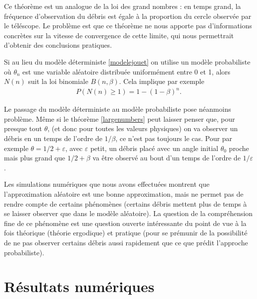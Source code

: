 \documentclass[a4paper,11pt]{article}
\newcommand{\eps}{\varepsilon}
\numberwithin{section}{part}
\begin{document}
Ce théorème est un analogue de la loi des grand nombres : en temps
grand, la fréquence d'observation du débris est égale à la proportion
du cercle observée par le téléscope. Le problème est que ce théorème
ne nous apporte pas d'informations concrètes sur la vitesse de
convergence de cette limite, qui nous permettrait d'obtenir des
conclusions pratiques. 

Si au lieu du modèle déterministe \eqref{modelejouet} on utilise un
modèle probabiliste où $\theta_{n}$ est une variable aléatoire
distribuée uniformément entre 0 et 1, alors $N(n)$ suit la loi
binomiale $B(n,\beta)$. Cela implique par exemple
\begin{align}
  P(N(n) \geq 1) = 1 - (1-\beta)^{n}.
\end{align}

Le passage du modèle déterministe au modèle probabiliste pose
néanmoins problème. Même si le théorème \eqref{largenumbers} peut
laisser penser que, pour presque tout $\theta$, (et donc pour toutes
les valeurs physiques) on va observer un débris en un temps de l'ordre
de $1/\beta$, ce n'est pas toujours le cas. Pour par exemple $\theta =
1/2 + \eps$, avec $\eps$ petit, un débris placé avec un angle initial
$\theta_{0}$ proche mais plus grand que $1/2 + \beta$ va être observé
au bout d'un temps de l'ordre de $1/\eps$.

Les simulations numériques que nous avons effectuées montrent que
l'approximation aléatoire est une bonne approximation, mais ne permet
pas de rendre compte de certains phénomènes (certains débris mettent
plus de temps à se laisser observer que dans le modèle aléatoire). La
question de la compréhension fine de ce phénomène est une question
ouverte intéressante du point de vue à la fois théorique (théorie
ergodique) et pratique (pour se prémunir de la possibilité de ne pas
observer certains débris aussi rapidement que ce que prédit l'approche
probabiliste).

\section{Résultats numériques}
\end{document}
